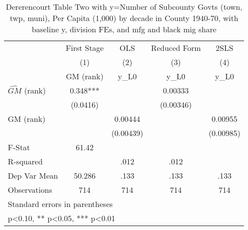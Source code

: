 \begin{table}[htbp]\centering
\def\sym#1{\ifmmode^{#1}\else\(^{#1}\)\fi}
\caption{Dererencourt Table Two with y=Number of Subcounty Govts (town, twp, muni), Per Capita (1,000) by decade in County 1940-70, with baseline y, division FEs, and mfg and black mig share}
\begin{tabular}{l*{4}{c}}
\toprule
                    & First Stage   &         OLS   &Reduced Form   &        2SLS   \\
                    &\multicolumn{1}{c}{(1)}&\multicolumn{1}{c}{(2)}&\multicolumn{1}{c}{(3)}&\multicolumn{1}{c}{(4)}\\
                    &\multicolumn{1}{c}{GM  (rank)}&\multicolumn{1}{c}{y\_L0}&\multicolumn{1}{c}{y\_L0}&\multicolumn{1}{c}{y\_L0}\\
\midrule
$\hat{GM}$ (rank)   &       0.348***&               &     0.00333   &               \\
                    &    (0.0416)   &               &   (0.00346)   &               \\
\addlinespace
GM  (rank)          &               &     0.00444   &               &     0.00955   \\
                    &               &   (0.00439)   &               &   (0.00985)   \\
\midrule
F-Stat              &       61.42   &               &               &               \\
R-squared           &               &        .012   &        .012   &               \\
Dep Var Mean        &      50.286   &        .133   &        .133   &        .133   \\
Observations        &         714   &         714   &         714   &         714   \\
\bottomrule
\multicolumn{5}{l}{\footnotesize Standard errors in parentheses}\\
\multicolumn{5}{l}{\footnotesize * p<0.10, ** p<0.05, *** p<0.01}\\
\end{tabular}
\end{table}
